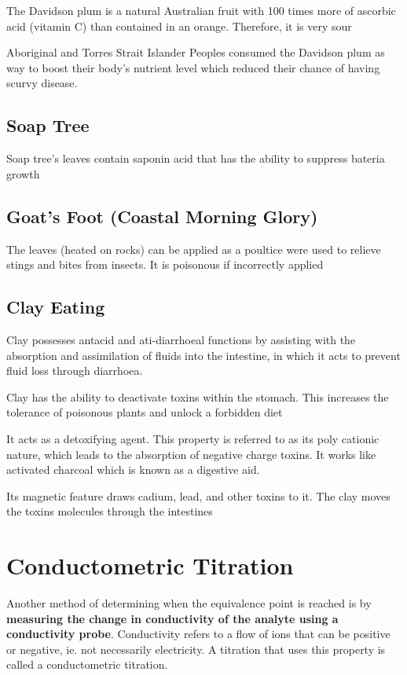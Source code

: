 		The Davidson plum is a natural Australian fruit with 100 times more of ascorbic acid (vitamin C) than contained in an orange. Therefore, it is very sour

		Aboriginal and Torres Strait Islander Peoples consumed the Davidson plum as way to boost their body’s nutrient level which reduced their chance of having scurvy disease.

	\subsection{Soap Tree}
	
		Soap tree's leaves contain saponin acid that has the ability to suppress bateria growth

	\subsection{Goat's Foot (Coastal Morning Glory)}
	
		The leaves (heated on rocks) can be applied as a poultice were used to relieve stings and bites from insects. It is poisonous if incorrectly applied

	\subsection{Clay Eating}
	
		Clay possesses antacid and ati-diarrhoeal functions by assisting with the absorption and assimilation of fluids into the intestine, in which it acts to prevent fluid loss through diarrhoea.

		Clay has the ability to deactivate toxins within the stomach. This increases the tolerance of poisonous plants and unlock a forbidden diet

		It acts as a detoxifying agent. This property is referred to as its poly cationic nature, which leads to the absorption of negative charge toxins. It works like activated charcoal which is known as a digestive aid.

		Its magnetic feature draws cadium, lead, and other toxins to it. The clay moves the toxins molecules through the intestines

\section{Conductometric Titration}

	Another method of determining when the equivalence point is reached is by \textbf{measuring the change in conductivity of the analyte using a conductivity probe}. Conductivity refers to a flow of ions that can be positive or negative, ie. not necessarily electricity. A titration that uses this property is called a conductometric titration.

